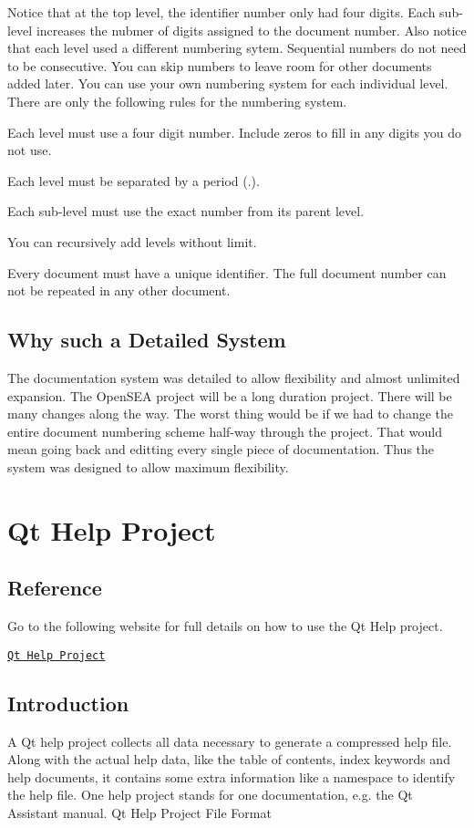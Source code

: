 Notice that at the top level, the identifier number only had four digits. Each sub-\/level increases the nubmer of digits assigned to the document number. Also notice that each level used a different numbering sytem. Sequential numbers do not need to be consecutive. You can skip numbers to leave room for other documents added later. You can use your own numbering system for each individual level. There are only the following rules for the numbering system.


\begin{DoxyEnumerate}
\item Each level must use a four digit number. Include zeros to fill in any digits you do not use.
\item Each level must be separated by a period (.).
\item Each sub-\/level must use the exact number from its parent level.
\item You can recursively add levels without limit.
\item Every document must have a unique identifier. The full document number can not be repeated in any other document.
\end{DoxyEnumerate}\hypertarget{docnumbersys_why-system}{}\subsection{Why such a Detailed System}\label{docnumbersys_why-system}
The documentation system was detailed to allow flexibility and almost unlimited expansion. The Open\-S\-E\-A project will be a long duration project. There will be many changes along the way. The worst thing would be if we had to change the entire document numbering scheme half-\/way through the project. That would mean going back and editting every single piece of documentation. Thus the system was designed to allow maximum flexibility. \hypertarget{helpproject}{}\section{Qt Help Project}\label{helpproject}
\hypertarget{helpproject_helproject_reference}{}\subsection{Reference}\label{helpproject_helproject_reference}
Go to the following website for full details on how to use the Qt Help project.

\href{http://qt-project.org/doc/qt-4.8/qthelpproject.html}{\tt Qt Help Project}\hypertarget{helpproject_helpproject-intro}{}\subsection{Introduction}\label{helpproject_helpproject-intro}
A Qt help project collects all data necessary to generate a compressed help file. Along with the actual help data, like the table of contents, index keywords and help documents, it contains some extra information like a namespace to identify the help file. One help project stands for one documentation, e.\-g. the Qt Assistant manual. Qt Help Project File Format


